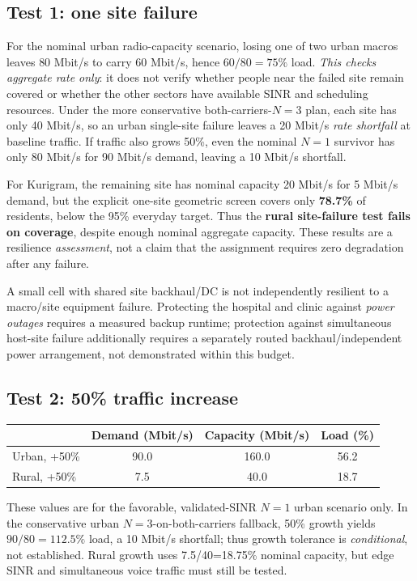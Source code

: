 \documentclass[9pt,a4paper]{extarticle}
\newcommand{\key}[1]{\textbf{#1}}
\begin{document}
\subsection{Test 1: one site failure}
For the nominal urban radio-capacity scenario, losing one of two urban macros
leaves $80$ Mbit/s to carry $60$ Mbit/s, hence $60/80=75\%$ load. \emph{This
checks aggregate rate only}: it does not verify whether people near the failed
site remain covered or whether the other sectors have available SINR and
scheduling resources. Under the more conservative both-carriers-$N=3$ plan,
each site has only 40 Mbit/s, so an urban single-site failure leaves a
20 Mbit/s \emph{rate shortfall} at baseline traffic. If traffic also grows 50\%,
even the nominal $N=1$ survivor has only 80 Mbit/s for 90 Mbit/s demand,
leaving a 10 Mbit/s shortfall.

For Kurigram, the remaining site has nominal capacity 20 Mbit/s for 5 Mbit/s
demand, but the explicit one-site geometric screen covers only \key{78.7\%}
of residents, below the 95\% everyday target. Thus the \key{rural site-failure
test fails on coverage}, despite enough nominal aggregate capacity. These
results are a resilience \emph{assessment}, not a claim that the assignment
requires zero degradation after any failure.

A small cell with shared site backhaul/DC is not independently resilient to
a macro/site equipment failure. Protecting the hospital and clinic against
\emph{power outages} requires a measured backup runtime; protection against
simultaneous host-site failure additionally requires a separately routed
backhaul/independent power arrangement, not demonstrated within this budget.

\subsection{Test 2: 50\% traffic increase}
\begin{center}\small
\begin{tabular}{@{}lccc@{}}
\toprule
& Demand (Mbit/s) & Capacity (Mbit/s) & Load (\%) \\
\midrule
Urban, +50\% & 90.0 & 160.0 & 56.2 \\
Rural, +50\% & 7.5 & 40.0 & 18.7 \\
\bottomrule
\end{tabular}
\end{center}

These values are for the favorable, validated-SINR $N=1$ urban scenario only.
In the conservative urban $N=3$-on-both-carriers fallback, 50\% growth yields
$90/80=112.5\%$ load, a 10 Mbit/s shortfall; thus growth tolerance is
\emph{conditional}, not established. Rural growth uses 7.5/40=18.75\%
nominal capacity, but edge SINR and simultaneous voice traffic must still be tested.
\end{document}
